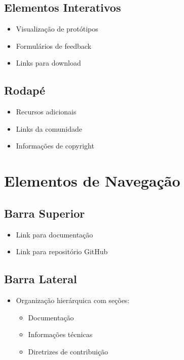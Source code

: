 \begin{itemize}
\begin{itemize}
\subsection{Elementos Interativos}
\begin{itemize}
    \item Visualização de protótipos
    \item Formulários de feedback
    \item Links para download
\end{itemize}

\subsection{Rodapé}
\begin{itemize}
    \item Recursos adicionais
    \item Links da comunidade
    \item Informações de copyright
\end{itemize}

\section{Elementos de Navegação}

\subsection{Barra Superior}
\begin{itemize}
    \item Link para documentação
    \item Link para repositório GitHub
\end{itemize}

\subsection{Barra Lateral}
\begin{itemize}
    \item Organização hierárquica com seções:
    \begin{itemize}
        \item Documentação
        \item Informações técnicas
        \item Diretrizes de contribuição
    \end{itemize}
\end{itemize}


\end{itemize}
\end{itemize}
